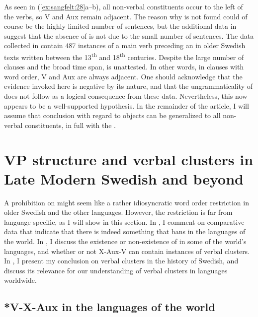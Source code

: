 \documentclass[output=paper, colorlinks, citecolor=brown]{langscibook}
\begin{document}
As seen in (\ref{ex:sangfelt:28}a–b), all non-verbal constituents occur to the left of the verbs, so V and Aux remain adjacent. The reason why  is not found could of course be the highly limited number of sentences, but the additional data in \citet{Sangfelt2019} suggest that the absence of  is not due to the small number of sentences. The data collected in \citet[133]{Sangfelt2019} contain 487 instances of a main verb preceding an  in older Swedish texts written between the 13\textsuperscript{th} and 18\textsuperscript{th} centuries. Despite the large number of clauses and the broad time span,  is unattested. In other words, in clauses with  word order, V and Aux are always adjacent. One should acknowledge that the evidence invoked here is negative by its nature, and that the ungrammaticality of  does not follow as a logical consequence from these data. Nevertheless, this now appears to be a well-supported hypothesis. In the remainder of the article, I will assume that  conclusion with regard to objects can be generalized to all non-verbal constituents, in full  with the .

\section{VP structure and verbal clusters in Late Modern Swedish and beyond}\label{sec:sangfelt:5}

A prohibition on  might seem like a rather idiosyncratic word order restriction in older Swedish and the other  languages. However, the restriction is far from language-specific, as I will show in this section. In , I comment on comparative data that indicate that there is indeed something that bans  in the languages of the world. In , I discuss the existence or non-existence of  in some of the world’s languages, and whether or not X-Aux-V can contain instances of verbal clusters. In , I present my conclusion on verbal clusters in the history of Swedish, and discuss its relevance for our understanding of verbal clusters in languages worldwide.

\subsection{*V-X-Aux in the languages of the world}\label{sec:sangfelt:5.1}
\end{document}

